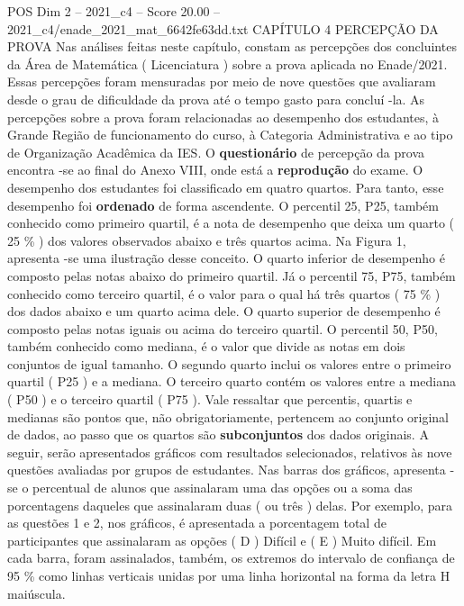 \begin{textsample}{POS Dim 2 – 2021\_c4 – Score 20.00 – 2021\_c4/enade\_2021\_mat\_6642fe63dd.txt}  \label{ex:f2_pos_035}
CAPÍTULO 4 PERCEPÇÃO DA PROVA Nas análises feitas neste capítulo, constam as percepções dos concluintes da Área de Matemática ( Licenciatura ) sobre a prova aplicada no Enade/2021.
Essas percepções foram mensuradas por meio de nove questões que avaliaram desde o grau de dificuldade da prova até o tempo gasto para concluí -la.
As percepções sobre a prova foram relacionadas ao desempenho dos estudantes, à Grande Região de funcionamento do curso, à Categoria Administrativa e ao tipo de Organização Acadêmica da IES.
O \textbf{questionário} de percepção da prova encontra -se ao final do Anexo VIII, onde está a \textbf{reprodução} do exame.
O desempenho dos estudantes foi classificado em quatro quartos.
Para tanto, esse desempenho foi \textbf{ordenado} de forma ascendente.
O percentil 25, P25, também conhecido como primeiro quartil, é a nota de desempenho que deixa um quarto ( 25 \% ) dos valores observados abaixo e três quartos acima.
Na Figura 1, apresenta -se uma ilustração desse conceito.
O quarto inferior de desempenho é composto pelas notas abaixo do primeiro quartil.
Já o percentil 75, P75, também conhecido como terceiro quartil, é o valor para o qual há três quartos ( 75 \% ) dos dados abaixo e um quarto acima dele.
O quarto superior de desempenho é composto pelas notas iguais ou acima do terceiro quartil.
O percentil 50, P50, também conhecido como mediana, é o valor que divide as notas em dois conjuntos de igual tamanho.
O segundo quarto inclui os valores entre o primeiro quartil ( P25 ) e a mediana.
O terceiro quarto contém os valores entre a mediana ( P50 ) e o terceiro quartil ( P75 ).
Vale ressaltar que percentis, quartis e medianas são pontos que, não obrigatoriamente, pertencem ao conjunto original de dados, ao passo que os quartos são \textbf{subconjuntos} dos dados originais.
A seguir, serão apresentados gráficos com resultados selecionados, relativos às nove questões avaliadas por grupos de estudantes.
Nas barras dos gráficos, apresenta -se o percentual de alunos que assinalaram uma das opções ou a soma das porcentagens daqueles que assinalaram duas ( ou três ) delas.
Por exemplo, para as questões 1 e 2, nos gráficos, é apresentada a porcentagem total de participantes que assinalaram as opções ( D ) Difícil e ( E ) Muito difícil.
Em cada barra, foram assinalados, também, os extremos do intervalo de confiança de 95 \% como linhas verticais unidas por uma linha horizontal na forma da letra H maiúscula.

\end{textsample}
